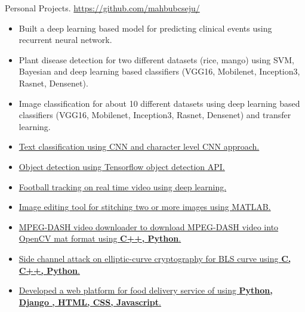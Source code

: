 \documentclass[]{mcdowellcv}
\begin{document}
    \begin{cvsection}{Personal Projects.  \href{https://github.com/mahbubcseju/} {https://github.com/mahbubcseju/}}
		\begin{cvsubsection}{}{}{}	
		       \vspace{2.1pt}
			\begin{itemize}
				\item Built a deep learning based model for predicting clinical events using recurrent neural network.
				\item Plant disease detection for two different  datasets (rice, mango) using  SVM, Bayesian and deep learning based classifiers (VGG16, Mobilenet, Inception3, Rasnet, Densenet).
				\item Image classification for about 10 different  datasets using  deep learning based classifiers (VGG16, Mobilenet, Inception3, Rasnet, Densenet) and transfer learning.
			    \item \href{https://github.com/mahbubcseju/CNN-for-text-classification-using-keras-for-yoon-kim-paper} {Text classification using CNN and character level CNN approach.}
			     \item \href{https://github.com/mahbubcseju/object_detection_using_tensorflow} {Object detection using Tensorflow object detection API.}
			    \item \href{https://github.com/mahbubcseju/Football_Tracking_using_Tensorflow} {Football tracking on real time video using deep learning.}
				\item \href{https://github.com/mahbubcseju/Automatic_Image_Stitching_using_Feature_Based_Method}{Image editing tool for stitching two or more images using MATLAB.} 
				\item \href{https://github.com/mahbubcseju/Downloader_MPEG_DASH_to_Opencv_Mat_using_libdash_Bitmovin}{MPEG-DASH video downloader to download MPEG-DASH video into OpenCV mat format using \textbf{C++, Python}.} 
				\item \href{https://github.com/mahbubcseju/Side-channel-Attack}{Side channel attack on  elliptic-curve cryptography for BLS curve using \textbf{C, C++, Python}.} 
				\item \href{https://github.com/mahbubcseju/JUFoodie}{Developed a web platform for food delivery service of  using \textbf{Python, Django , HTML, CSS, Javascript}.} 
			\end{itemize}
		\end{cvsubsection}
	\end{cvsection}
\end{document}
